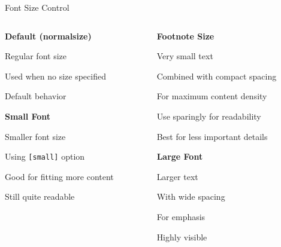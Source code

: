 \documentclass[11pt,compress,t,notes=noshow, xcolor=table]{beamer}
\begin{document}

\begin{frame}{Font Size Control}
  \begin{columns}[T]
    \begin{column}{0.48\textwidth}
      \textbf{Default (normalsize)}
      \begin{itemizeM}
        \item Regular font size
        \item Used when no size specified
        \item Default behavior
      \end{itemizeM}
      
      \vspace{0.5cm}
      \textbf{Small Font}
      \begin{itemizeM}[small]
        \item Smaller font size
        \item Using \texttt{[small]} option
        \item Good for fitting more content
        \item Still quite readable
      \end{itemizeM}
    \end{column}
    
    \begin{column}{0.48\textwidth}
      \textbf{Footnote Size}
      \begin{itemizeS}[footnotesize]
        \item Very small text
        \item Combined with compact spacing
        \item For maximum content density
        \item Use sparingly for readability
        \item Best for less important details
      \end{itemizeS}
      
      \vspace{0.5cm}
      \textbf{Large Font}
      \begin{itemizeL}[large]
        \item Larger text
        \item With wide spacing
        \item For emphasis
        \item Highly visible
      \end{itemizeL}
    \end{column}
  \end{columns}
\end{frame}
\end{document}
